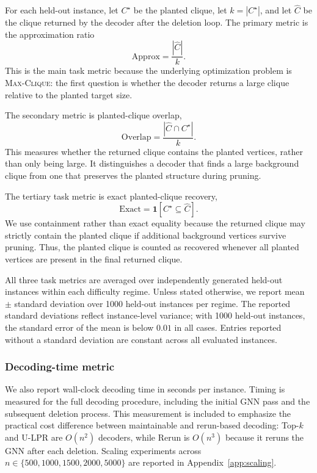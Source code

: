 \documentclass[mathematics,article,submit,pdftex,moreauthors]{Definitions/mdpi}
\begin{document}
For each held-out instance, let $C^\star$ be the planted clique, let
$k=|C^\star|$, and let $\hat C$ be the clique returned by the decoder after the
deletion loop. The primary metric is the approximation ratio
\[
  \mathrm{Approx}
  =
  \frac{|\hat C|}{k}.
\]
This is the main task metric because the underlying optimization problem is
\textsc{Max-Clique}: the first question is whether the decoder returns a large
clique relative to the planted target size.

The secondary metric is planted-clique overlap,
\[
  \mathrm{Overlap}
  =
  \frac{|\hat C \cap C^\star|}{k}.
\]
This measures whether the returned clique contains the planted vertices, rather
than only being large. It distinguishes a decoder that finds a large background
clique from one that preserves the planted structure during pruning.

The tertiary task metric is exact planted-clique recovery,
\[
  \mathrm{Exact}
  =
  \mathbf{1}\!\left[ C^\star \subseteq \hat C \right].
\]
We use containment rather than exact equality because the returned clique may
strictly contain the planted clique if additional background vertices survive
pruning. Thus, the planted clique is counted as recovered whenever all planted
vertices are present in the final returned clique.

All three task metrics are averaged over independently generated held-out instances
within each difficulty regime. Unless stated otherwise, we report mean
$\pm$ standard deviation over 1000 held-out instances per regime. The reported
standard deviations reflect instance-level variance; with 1000 held-out instances,
the standard error of the mean is below $0.01$ in all cases. Entries reported
without a standard deviation are constant across all evaluated instances.

\subsubsection{Decoding-time metric}

We also report wall-clock decoding time in seconds per instance. Timing is measured
for the full decoding procedure, including the initial GNN pass and the subsequent
deletion process. This measurement is included to emphasize the practical cost
difference between maintainable and rerun-based decoding: Top-$k$ and U-LPR are
$O(n^2)$ decoders, while Rerun is $O(n^3)$ because it reruns the GNN after each
deletion. Scaling experiments across $n\in\{500,1000,1500,2000,5000\}$ are reported
in Appendix~\ref{app:scaling}.
\end{document}
